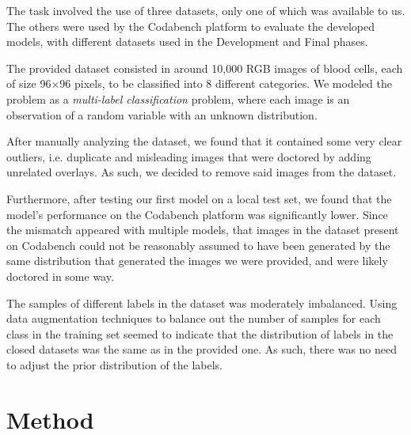 \documentclass[11pt]{article}
\begin{document}
\begin{multicols}{2}

      The task involved the use of three datasets, only one of which was available to us. The others were used by the Codabench\cite{codabench} platform to evaluate the developed models, with different datasets used in the Development and Final phases.

      The provided dataset consisted in around 10,000 RGB images of blood cells, each of size 96\(\times\)96 pixels, to be classified into 8 different categories. We modeled the problem as a \textit{multi-label classification} problem, where each image is an observation of a random variable with an unknown distribution.
      
      After manually analyzing the dataset, we found that it contained some very clear outliers, i.e. duplicate and misleading images that were doctored by adding unrelated overlays. As such, we decided to remove said images from the dataset.

      Furthermore, after testing our first model on a local test set, we found that the model's performance on the Codabench platform was significantly lower. Since the mismatch appeared with multiple models, that images in the dataset present on Codabench could not be reasonably assumed to have been generated by the same distribution that generated the images we were provided, and were likely doctored in some way.

      The samples of different labels in the dataset was moderately imbalanced. Using data augmentation techniques to balance out the number of samples for each class in the training set seemed to indicate that the distribution of labels in the closed datasets was the same as in the provided one. As such, there was no need to adjust the prior distribution of the labels.

      \section{Method}


\end{multicols}
\end{document}
